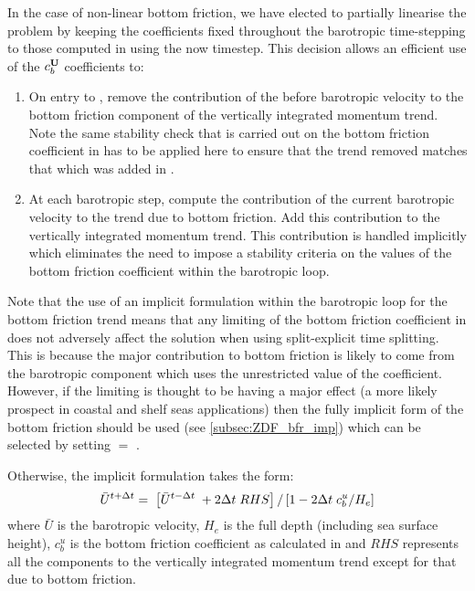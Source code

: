 \documentclass[../tex_main/NEMO_manual]{subfiles}
\begin{document}
In the case of non-linear bottom friction, we have elected to partially linearise the problem by
keeping the coefficients fixed throughout the barotropic time-stepping to those computed in
 using the now timestep.
This decision allows an efficient use of the $c_b^{\mathbf{U}}$ coefficients to:

\begin{enumerate}
\item On entry to , remove the contribution of the before barotropic velocity to
  the bottom friction component of the vertically integrated momentum trend.
  Note the same stability check that is carried out on the bottom friction coefficient in  has to
  be applied here to ensure that the trend removed matches that which was added in .
\item At each barotropic step, compute the contribution of the current barotropic velocity to
  the trend due to bottom friction.
  Add this contribution to the vertically integrated momentum trend.
  This contribution is handled implicitly which eliminates the need to impose a stability criteria on
  the values of the bottom friction coefficient within the barotropic loop. 
\end{enumerate}

Note that the use of an implicit formulation within the barotropic loop for the bottom friction trend means that
any limiting of the bottom friction coefficient in  does not adversely affect the solution when
using split-explicit time splitting.
This is because the major contribution to bottom friction is likely to come from the barotropic component which
uses the unrestricted value of the coefficient.
However, if the limiting is thought to be having a major effect
(a more likely prospect in coastal and shelf seas applications) then
the fully implicit form of the bottom friction should be used (see \autoref{subsec:ZDF_bfr_imp})
which can be selected by setting  $=$ .

Otherwise, the implicit formulation takes the form:
\begin{equation} \label{eq:zdfbfr_implicitts}
 \bar{U}^{t+ \Delta t} = \; \left [ \bar{U}^{t-\Delta t}\; + 2 \Delta t\;RHS \right ] / \left [ 1 - 2 \Delta t \;c_b^{u} / H_e \right ]  
\end{equation}
where $\bar U$ is the barotropic velocity, $H_e$ is the full depth (including sea surface height), 
$c_b^u$ is the bottom friction coefficient as calculated in  and
$RHS$ represents all the components to the vertically integrated momentum trend except for
that due to bottom friction.
\end{document}
